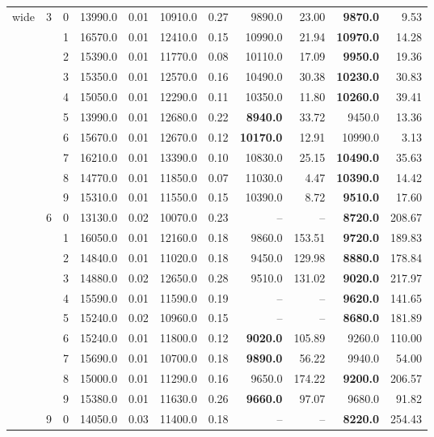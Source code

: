 {\begin{longtable}{ccc|rr|rr|rr|rr}
wide & 3 & 0 & 13990.0 & 0.01 & 10910.0 & 0.27 & 9890.0 & 23.00 & \textbf{9870.0} & 9.53 \\
 &  & 1 & 16570.0 & 0.01 & 12410.0 & 0.15 & 10990.0 & 21.94 & \textbf{10970.0} & 14.28 \\
 &  & 2 & 15390.0 & 0.01 & 11770.0 & 0.08 & 10110.0 & 17.09 & \textbf{9950.0} & 19.36 \\
 &  & 3 & 15350.0 & 0.01 & 12570.0 & 0.16 & 10490.0 & 30.38 & \textbf{10230.0} & 30.83 \\
 &  & 4 & 15050.0 & 0.01 & 12290.0 & 0.11 & 10350.0 & 11.80 & \textbf{10260.0} & 39.41 \\
 &  & 5 & 13990.0 & 0.01 & 12680.0 & 0.22 & \textbf{8940.0} & 33.72 & 9450.0 & 13.36 \\
 &  & 6 & 15670.0 & 0.01 & 12670.0 & 0.12 & \textbf{10170.0} & 12.91 & 10990.0 & 3.13 \\
 &  & 7 & 16210.0 & 0.01 & 13390.0 & 0.10 & 10830.0 & 25.15 & \textbf{10490.0} & 35.63 \\
 &  & 8 & 14770.0 & 0.01 & 11850.0 & 0.07 & 11030.0 & 4.47 & \textbf{10390.0} & 14.42 \\
 &  & 9 & 15310.0 & 0.01 & 11550.0 & 0.15 & 10390.0 & 8.72 & \textbf{9510.0} & 17.60 \\ \hline
 & 6 & 0 & 13130.0 & 0.02 & 10070.0 & 0.23 & -- & -- & \textbf{8720.0} & 208.67 \\
 &  & 1 & 16050.0 & 0.01 & 12160.0 & 0.18 & 9860.0 & 153.51 & \textbf{9720.0} & 189.83 \\
 &  & 2 & 14840.0 & 0.01 & 11020.0 & 0.18 & 9450.0 & 129.98 & \textbf{8880.0} & 178.84 \\
 &  & 3 & 14880.0 & 0.02 & 12650.0 & 0.28 & 9510.0 & 131.02 & \textbf{9020.0} & 217.97 \\
 &  & 4 & 15590.0 & 0.01 & 11590.0 & 0.19 & -- & -- & \textbf{9620.0} & 141.65 \\
 &  & 5 & 15240.0 & 0.02 & 10960.0 & 0.15 & -- & -- & \textbf{8680.0} & 181.89 \\
 &  & 6 & 15240.0 & 0.01 & 11800.0 & 0.12 & \textbf{9020.0} & 105.89 & 9260.0 & 110.00 \\
 &  & 7 & 15690.0 & 0.01 & 10700.0 & 0.18 & \textbf{9890.0} & 56.22 & 9940.0 & 54.00 \\
 &  & 8 & 15000.0 & 0.01 & 11290.0 & 0.16 & 9650.0 & 174.22 & \textbf{9200.0} & 206.57 \\
 &  & 9 & 15380.0 & 0.01 & 11630.0 & 0.26 & \textbf{9660.0} & 97.07 & 9680.0 & 91.82 \\ \hline
 & 9 & 0 & 14050.0 & 0.03 & 11400.0 & 0.18 & -- & -- & \textbf{8220.0} & 254.43 \\

\end{longtable}}

